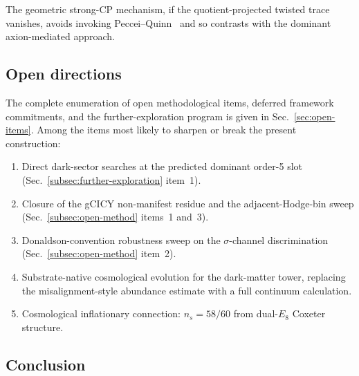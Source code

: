 ﻿\documentclass[reprint,amsmath,amssymb,aps,prd,longbibliography,floatfix]{revtex4-2}
\begin{document}
The geometric strong-CP mechanism, if the quotient-projected twisted
trace vanishes, avoids invoking Peccei--Quinn~\cite{PecceiQuinn1977}
and so contrasts with the dominant axion-mediated approach.

\subsection{Open directions}

The complete enumeration of open methodological items, deferred
framework commitments, and the further-exploration program is given
in Sec.~\ref{sec:open-items}. Among the items most likely to sharpen
or break the present construction:
\begin{enumerate}
\item Direct dark-sector searches at the predicted dominant order-5
slot (Sec.~\ref{subsec:further-exploration} item~1).
\item Closure of the gCICY non-manifest residue and the
adjacent-Hodge-bin sweep
(Sec.~\ref{subsec:open-method} items~1 and~3).
\item Donaldson-convention robustness sweep on the
$\sigma$-channel discrimination
(Sec.~\ref{subsec:open-method} item~2).
\item Substrate-native cosmological evolution for the dark-matter
tower, replacing the misalignment-style abundance estimate with a
full continuum calculation.
\item Cosmological inflationary connection: $n_s = 58/60$ from dual-$E_8$
Coxeter structure.
\end{enumerate}

\subsection{Conclusion}
\end{document}
